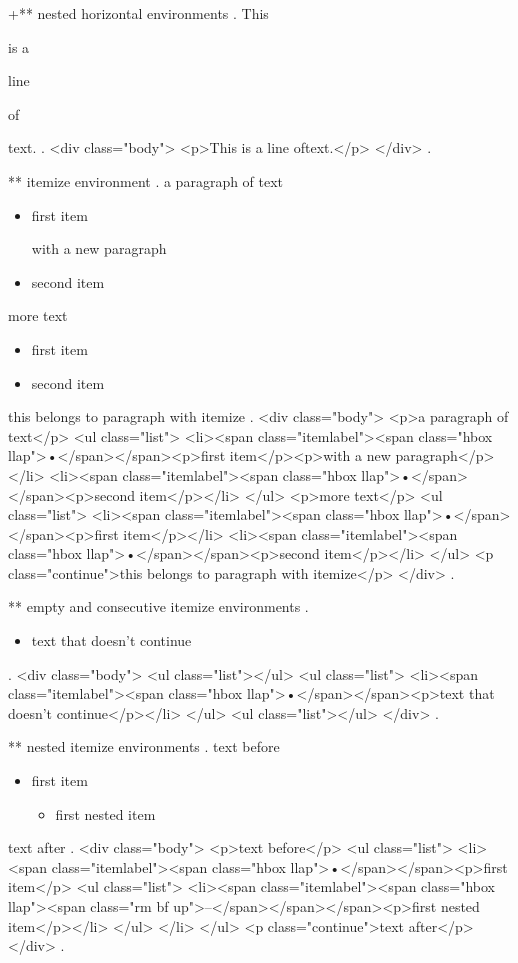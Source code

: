 +** nested horizontal environments
.
This \begin{empty}is a \begin{empty}line\end{empty} of\end{empty} text.
.
<div class="body">
<p>This is a line​ of​ text.</p>
</div>
.



** itemize environment
.
a paragraph of text

\begin{itemize}
    \item first item

        with a new paragraph
    \item second item
\end{itemize}
%

more text

\begin{itemize}
    \item first item
    \item second item

\end{itemize}
this belongs to paragraph with itemize
.
<div class="body">
<p>a paragraph of text</p>
<ul class="list">
<li><span class="itemlabel"><span class="hbox llap">•</span></span><p>ﬁrst item</p><p>with a new paragraph</p></li>
<li><span class="itemlabel"><span class="hbox llap">•</span></span><p>second item</p></li>
</ul>
<p>more text</p>
<ul class="list">
<li><span class="itemlabel"><span class="hbox llap">•</span></span><p>ﬁrst item</p></li>
<li><span class="itemlabel"><span class="hbox llap">•</span></span><p>second item</p></li>
</ul>
<p class="continue">this belongs to paragraph with itemize</p>
</div>
.


** empty and consecutive itemize environments
.
\begin{itemize}

\end{itemize}
\begin{itemize}
    \item text that doesn't continue
\end{itemize}
\begin{itemize}
\end{itemize}
.
<div class="body">
<ul class="list"></ul>
<ul class="list">
<li><span class="itemlabel"><span class="hbox llap">•</span></span><p>text that doesn’t continue</p></li>
</ul>
<ul class="list"></ul>
</div>
.


** nested itemize environments
.
text before
\begin{itemize}
    \item first item
        \begin{itemize}
            \item first nested item
        \end{itemize}
\end{itemize}
text after
.
<div class="body">
<p>text before</p>
<ul class="list">
<li><span class="itemlabel"><span class="hbox llap">•</span></span><p>ﬁrst item</p>
<ul class="list">
<li><span class="itemlabel"><span class="hbox llap"><span class="rm bf up">–</span></span></span><p>ﬁrst nested item</p></li>
</ul>
</li>
</ul>
<p class="continue">text after</p>
</div>
.


